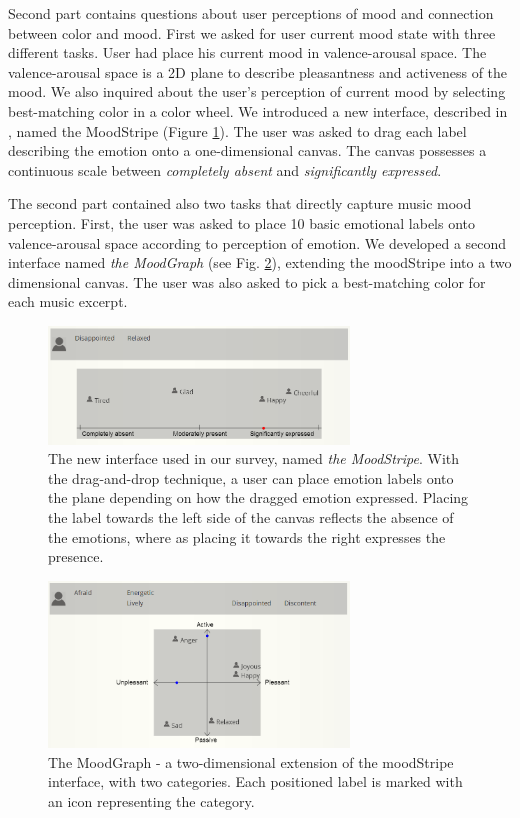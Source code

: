 \documentclass[a4paper]{article}
\begin{document}
Second part contains questions about user perceptions of mood and connection between color and mood. First we asked for user current mood state with three different tasks. User had place his current mood in valence-arousal space. The valence-arousal space is a 2D plane to describe pleasantness and activeness of the mood. We also inquired about the user's perception of current mood by selecting best-matching color in a color wheel. We introduced a new interface, described in \cite{pesek2014gathering}, named the MoodStripe (Figure \ref{moodstripe}). The user was asked to drag each label describing the emotion onto a one-dimensional canvas. The canvas possesses a continuous scale between \textit{completely absent} and \textit{significantly expressed}.

The second part contained also two tasks that directly capture music mood perception. First, the user was asked to place 10 basic emotional labels onto valence-arousal space according to perception of emotion. We developed a second interface named \textit{the  MoodGraph} (see Fig. \ref{moodgraph}), extending the moodStripe into a two dimensional canvas. The user was also asked to pick a best-matching color for each music excerpt.

\begin{figure}[ht]
\centering
\includegraphics[width=80mm]{moodstripe.png}
\caption{The new interface used in our survey, named \textit{the MoodStripe}. With the drag-and-drop technique, a user can place emotion labels onto the plane depending on how the dragged emotion expressed. Placing the label towards the left side of the canvas reflects the absence of the emotions, where as placing it towards the right expresses the presence.}
\label{moodstripe}
\end{figure}

\begin{figure}[ht]
\centering
\includegraphics[width=80mm]{moodgraph.png}
\caption{The MoodGraph - a two-dimensional extension of the moodStripe interface, with two categories. Each positioned label is marked with an icon representing the category.}
\label{moodgraph}
\end{figure}
\end{document}
